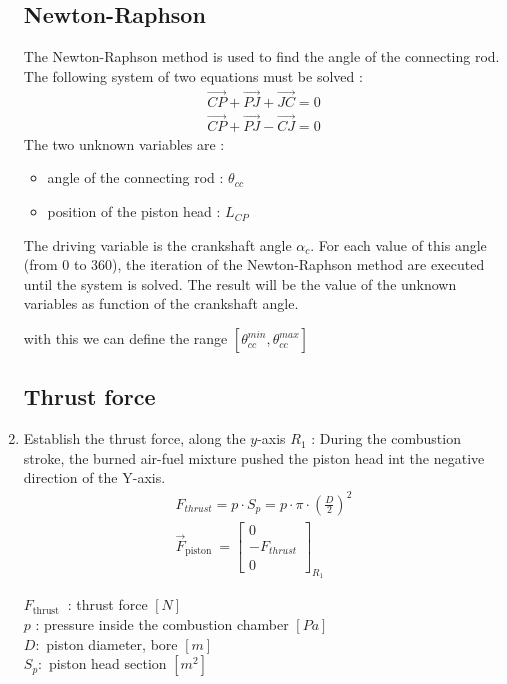\documentclass[12pt,a4paper]{article}
\begin{document}
\begin{enumerate}
	\subsection{Newton-Raphson}
	The Newton-Raphson method is used to find the angle of the connecting rod. The following system of two equations must be solved : 
	\begin{eqnarray}
		\vec{CP} + \vec{PJ} + \vec{JC} = 0\\
		\vec{CP} + \vec{PJ} - \vec{CJ} = 0
	\end{eqnarray} 
	The two unknown variables are : 
	\begin{itemize}
		\item angle of the connecting rod : $\theta_{cc}$
		\item position of the piston head : $L_{CP}$
	\end{itemize}
	The driving variable is the crankshaft angle $\alpha_c$.
	For each value of this angle (from 0 to 360), the iteration of the Newton-Raphson method are executed until the system is solved. 
	The result will be the value of the unknown variables as function of the crankshaft angle. 
		
	with this we can define the range $[\theta_{cc}^{min}, \theta_{cc}^{max}]$ 
	\subsection{Thrust force}

		\item Establish the thrust force, along the $y$-axis $R_{1}$ : 
	During the combustion stroke, the burned air-fuel mixture pushed the piston head int the negative direction of the Y-axis.
	\begin{gather*}
		F_{thrust}=p \cdot S_{p}=p \cdot \pi \cdot\left(\frac{D}{2}\right)^{2}  \tag{2}\\
		\vec{F}_{\text {piston }}=\left[\begin{array}{c}
			0 \\
			- F_{thrust} \\
			0
		\end{array}\right]_{R_{1}} \tag{3}
	\end{gather*}
	
	
	$F_{\text {thrust }}$ : thrust force $[N]$\\
	$p$ : pressure inside the combustion chamber $[P a]$\\
	$D:$ piston diameter, bore $[m]$\\
	$S_{p}:$ piston head section $\left[m^{2}\right]$\\
	



\end{enumerate}
\end{document}
